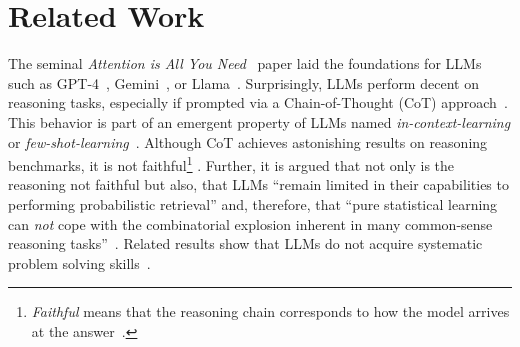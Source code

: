 \section{Related Work}
\label{sec:related-work}

The seminal \textit{Attention is All You Need}~\citep{vaswani_attention_2017} paper laid the foundations
for LLMs such as GPT-4~\citep{openai_gpt-4_2024}, Gemini~\citep{team_gemini_2024},
or Llama~\citep{grattafiori_llama_2024}.
%
Surprisingly, LLMs perform decent on reasoning tasks,
especially if prompted via a Chain-of-Thought (CoT) approach~\citep{wei_chain--thought_2022}.
This behavior is part of an emergent property of LLMs named \textit{in-context-learning}
or \textit{few-shot-learning}~\citep{shanahan_talking_2024}.
Although CoT achieves astonishing results on reasoning benchmarks,
it is not faithful\footnote{
\textit{Faithful} means that the reasoning chain corresponds to how the model arrives at the answer~\citep{lyu_faithful_2023}.}
\citep{lyu_faithful_2023}.
Further, it is argued that not only is the reasoning not faithful
but also, that LLMs ``remain limited in their capabilities to performing probabilistic retrieval'' 
and, therefore, that ``pure statistical learning can \textit{not} cope with the combinatorial explosion inherent in many common-sense reasoning tasks''~\citep{panas_can_2024}.
Related results show that LLMs do not
acquire systematic problem solving skills~\citep{dziri_faith_2023}.
%
%
%
%

